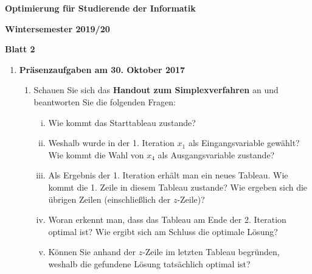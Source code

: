 \documentclass[11pt, a4paper]{article}
\begin{document}
\begin{center}
\begin{Large}
\textbf{Optimierung für Studierende der Informatik}
\end{Large}

\textbf{}
	
\vspace{0.5cm}

\textbf{Wintersemester 2019/20}

\textbf{Blatt 2}

\vspace{0.5cm}
\end{center}

\small

\begin{enumerate}[\bfseries A:]


\item \textbf{Präsenzaufgaben am 30. Oktober 2017}

\begin{enumerate}[\bfseries 1.]

\item Schauen Sie sich das \textbf{Handout zum Simplexverfahren} an und beantworten Sie die folgenden Fragen:
\begin{enumerate}[(i)]
\item Wie kommt das Starttableau zustande?
\item Weshalb wurde in der 1. Iteration $x_1$ als Eingangsvariable gewählt? Wie kommt die Wahl von $x_4$ als Ausgangsvariable zustande?
\item Als Ergebnis der 1. Iteration erhält man ein neues Tableau. Wie kommt die 1. Zeile in diesem Tableau zustande? Wie ergeben sich die übrigen Zeilen (einschließlich der $z$-Zeile)?
\item Woran erkennt man, dass das Tableau am Ende der 2. Iteration optimal ist? Wie ergibt sich am Schluss die optimale Lösung?
\item Können Sie anhand der $z$-Zeile im letzten Tableau begründen, weshalb die gefundene Lösung tatsächlich optimal ist?
\end{enumerate}


\end{enumerate}
\end{enumerate}
\end{document}
